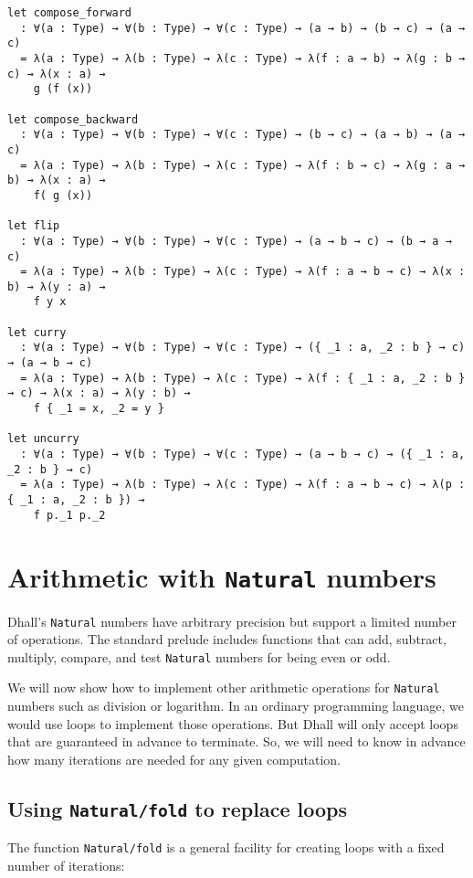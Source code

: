 \begin{lstlisting}[language=Dhall]
let compose_forward
  : ∀(a : Type) → ∀(b : Type) → ∀(c : Type) → (a → b) → (b → c) → (a → c)
  = λ(a : Type) → λ(b : Type) → λ(c : Type) → λ(f : a → b) → λ(g : b → c) → λ(x : a) →
    g (f (x))

let compose_backward
  : ∀(a : Type) → ∀(b : Type) → ∀(c : Type) → (b → c) → (a → b) → (a → c)
  = λ(a : Type) → λ(b : Type) → λ(c : Type) → λ(f : b → c) → λ(g : a → b) → λ(x : a) →
    f( g (x)) 

let flip
  : ∀(a : Type) → ∀(b : Type) → ∀(c : Type) → (a → b → c) → (b → a → c)
  = λ(a : Type) → λ(b : Type) → λ(c : Type) → λ(f : a → b → c) → λ(x : b) → λ(y : a) →
    f y x

let curry
  : ∀(a : Type) → ∀(b : Type) → ∀(c : Type) → ({ _1 : a, _2 : b } → c) → (a → b → c)
  = λ(a : Type) → λ(b : Type) → λ(c : Type) → λ(f : { _1 : a, _2 : b } → c) → λ(x : a) → λ(y : b) →
    f { _1 = x, _2 = y }

let uncurry
  : ∀(a : Type) → ∀(b : Type) → ∀(c : Type) → (a → b → c) → ({ _1 : a, _2 : b } → c)
  = λ(a : Type) → λ(b : Type) → λ(c : Type) → λ(f : a → b → c) → λ(p : { _1 : a, _2 : b }) →
    f p._1 p._2
\end{lstlisting}


\section{Arithmetic with \lstinline!Natural! numbers}


Dhall's \lstinline!Natural! numbers have arbitrary precision but support a limited number of operations.
The standard prelude includes functions that can add, subtract, multiply, compare, and test \lstinline!Natural! numbers for being even or odd.


We will now show how to implement other arithmetic operations for \lstinline!Natural! numbers such as division or logarithm.
In an ordinary programming language, we would use loops to implement those operations.
But Dhall will only accept loops that are guaranteed in advance to terminate.
So, we will need to know in advance how many iterations are needed for any given computation.


\subsection{Using \lstinline!Natural/fold! to replace loops}


The function \lstinline!Natural/fold! is a general facility for creating loops with a fixed number of iterations:


